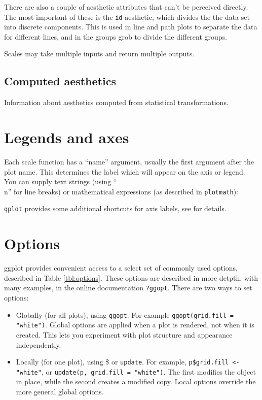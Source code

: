 There are also a couple of aesthetic attributes that can't be perceived directly.  The most important of these is the {\tt id} aesthetic, which divides the the data set into discrete components.   This is used in line and path plots to separate the data for different lines, and in the groups grob to divide the different groups. 

Scales may take multiple inputs and return multiple outputs.

\subsection{Computed aesthetics}\label{sub:computed_aesthetics} 

Information about aesthetics computed from statistical transformations.

\section{Legends and axes}\label{sec:customising_legends_and_axes}

Each scale function has a ``name'' argument, usually the first argument after the plot name.  This determines the label which will appear on the axis or legend. You can supply text strings (using ``\\n'' for line breaks) or mathematical expressions (as described in \verb|plotmath|):


\verb|qplot| provides some additional shortcuts for axis labels, see  for details.



\section{Options}\label{sec:options}

ggplot provides convenient access to a select set of commonly used options, described in Table \ref{tbl:options}.  These options are described in more detpth, with many examples, in the online documentation {\tt ?ggopt}.
There are two ways to set options:

\begin{itemize}
  \item Globally (for all plots), using {\tt ggopt}.  For example {\tt ggopt(grid.fill = "white")}.   Global options are applied when a plot is rendered, not when it is created.  This lets you experiment with plot structure and appearance independently.

  \item Locally (for one plot), using \$ or {\tt update}.  For example, {\tt p\$grid.fill <- "white"}, or {\tt update(p, grid.fill = "white")}.  The first modifies the object in place, while the second creates a modified copy. Local options override the more general global options.
\end{itemize}     


